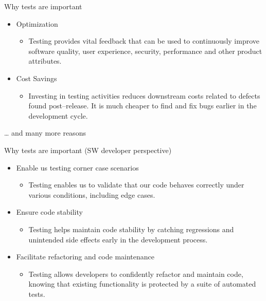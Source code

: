 \begin{frame}{Why tests are important}
\protect{}\label{why-tests-are-important-1}
\begin{itemize}
\tightlist
\item
  Optimization

  \begin{itemize}
  \tightlist
  \item
    Testing provides vital feedback that can be used to continuously
    improve software quality, user experience, security, performance and
    other product attributes.
  \end{itemize}
\item
  Cost Savings

  \begin{itemize}
  \tightlist
  \item
    Investing in testing activities reduces downstream costs related to
    defects found post--release. It is much cheaper to find and fix bugs
    earlier in the development cycle.
  \end{itemize}
\end{itemize}

\ldots{} and many more reasons
\end{frame}

\begin{frame}{Why tests are important (SW developer perspective)}
\protect{}\label{why-tests-are-important-sw-developer-perspective}
\begin{itemize}
\tightlist
\item
  Enable us testing corner case scenarios

  \begin{itemize}
  \tightlist
  \item
    Testing enables us to validate that our code behaves correctly under
    various conditions, including edge cases.
  \end{itemize}
\item
  Ensure code stability

  \begin{itemize}
  \tightlist
  \item
    Testing helps maintain code stability by catching regressions and
    unintended side effects early in the development process.
  \end{itemize}
\item
  Facilitate refactoring and code maintenance

  \begin{itemize}
  \tightlist
  \item
    Testing allows developers to confidently refactor and maintain code,
    knowing that existing functionality is protected by a suite of
    automated tests.
  \end{itemize}
\end{itemize}
\end{frame}

